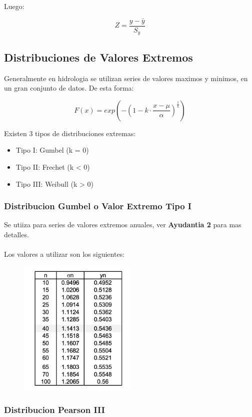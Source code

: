 Luego:

\begin{equation}
    Z = \frac{y - \bar{y}}{S_y}
\end{equation}

\subsection{Distribuciones de Valores Extremos}

Generalmente en hidrologia se utilizan series de valores maximos y minimos, en un gran conjunto de datos. De esta forma:

\begin{equation}
    F(x) = exp(-(1-k \cdot \frac{x-\mu}{\alpha})^{\frac{1}{k}})
\end{equation}

Existen 3 tipos de distribuciones extremas:

\begin{itemize}
    \item Tipo I: Gumbel (k = 0)
    \item Tipo II: Frechet (k < 0)
    \item Tipo III: Weibull (k > 0)
\end{itemize}

\subsubsection{Distribucion Gumbel o Valor Extremo Tipo I}

Se utiiza para series de valores extremos anuales, ver \textbf{Ayudantia 2} para mas detalles.
\\ \\
Los valores a utilizar son los siguientes:

\begin{figure}[H]
    \centering
    \includegraphics[width=0.5\textwidth]{imagenes/tabla_valores_gumbell.jpg}
    \label{fig:gumbel}
\end{figure}

\subsubsection{Distribucion Pearson III}

